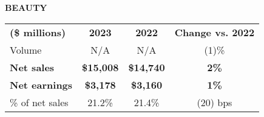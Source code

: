 \documentclass{article}
\begin{document}
\textbf{\large BEAUTY}

\vspace{0.5em}


\begin{tabularx}{\textwidth}{Xccc}

\textbf{(\$ millions)} & \textbf{2023} & \textbf{2022} & \textbf{Change vs. 2022} \\
\cline{2-4}
\rowcolor{cyan!20}
Volume & N/A & N/A & (1)\% \\
\textbf{Net sales} & \textbf{\$15,008} & \textbf{\$14,740} & \textbf{2\%} \\
\rowcolor{cyan!20}
\textbf{Net earnings} & \textbf{\$3,178} & \textbf{\$3,160} & \textbf{1\%} \\
\% of net sales & 21.2\% & 21.4\% & (20) bps \\
\hline
\end{tabularx}
\end{document}
